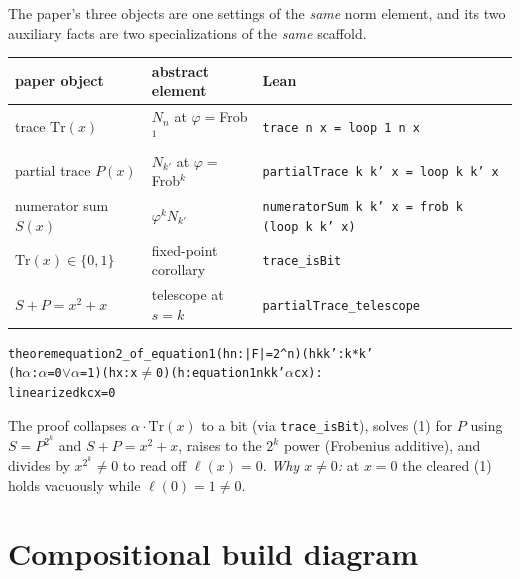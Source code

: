 \documentclass[11pt]{article}
\newenvironment{lean}{\begin{leanbox}\begin{alltt}\small}{\end{alltt}\end{leanbox}}
\newcommand{\ck}{\textcolor{grn}{\checkmark}}
\newcommand{\lc}[1]{\texttt{\small #1}}
\newcommand{\phiop}{\varphi}
\begin{document}
The paper's three objects are one settings of the \emph{same} norm element, and
its two auxiliary facts are two specializations of the \emph{same} scaffold.
\begin{center}\small
\renewcommand{\arraystretch}{1.3}
\begin{tabular}{@{}l l l@{}}
\textbf{paper object} & \textbf{abstract element} & \textbf{Lean}\\ \hline
trace $\mathrm{Tr}(x)$ & $N_n$ at $\phiop=$Frob$^1$ & \lc{trace n x = loop 1 n x}\\
partial trace $P(x)$ & $N_{k'}$ at $\phiop=$Frob$^k$ & \lc{partialTrace k k' x = loop k k' x}\\
numerator sum $S(x)$ & $\phiop^k N_{k'}$ & \lc{numeratorSum k k' x = frob k (loop k k' x)}\\ \hline
$\mathrm{Tr}(x)\in\{0,1\}$ & fixed-point corollary & \lc{trace\_isBit}\\
$S+P=x^2+x$ & telescope at $s{=}k$ & \lc{partialTrace\_telescope}\\
\end{tabular}
\end{center}
\begin{lean}
theorem equation2_of_equation1 (hn : |F| = 2^n) (hkk' : k*k' %
    (h\(\alpha\) : \(\alpha\)=0 \(\vee\) \(\alpha\)=1) (hx : x \(\neq\) 0) (h : equation1 n k k' \(\alpha\) c x) :
    linearized k c x = 0                                              \ck
\end{lean}
The proof collapses $\alpha\cdot\mathrm{Tr}(x)$ to a bit (via \lc{trace\_isBit}),
solves (1) for $P$ using $S=P^{2^k}$ and $S+P=x^2+x$, raises to the $2^k$ power
(Frobenius additive), and divides by $x^{2^k}\neq0$ to read off $\ell(x)=0$.
\emph{Why $x\neq0$:} at $x=0$ the cleared (1) holds vacuously while
$\ell(0)=1\neq0$.

\section*{Compositional build diagram}

\begin{center}
{\footnotesize
{}
}
\end{center}
\end{document}
